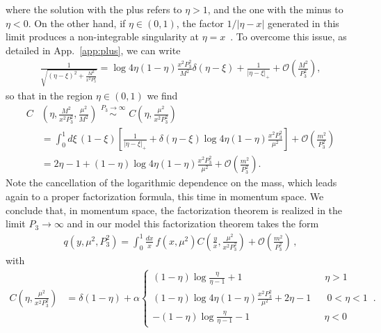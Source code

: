 where the solution with the plus refers to $\eta>1$, and the one with the minus
to $\eta<0$. On the other hand, if $\eta \in \left(0,1\right)$, the factor
$1/|\eta-x|$ generated in this limit produces a non-integrable singularity at
$\eta = x$~\cite{Radyushkin:2017lvu}. To overcome this issue, as detailed in App.~\ref{app:plus}, we can
write
\begin{align}
	\label{eq::limit} 
	\frac{1}{\sqrt{\left(\eta-\xi\right)^2 + \frac{M^2}{x^2 P_3^2}}} 
	= \log 4\eta\left(1-\eta\right) \frac{x^2P_3^2}{M^2}
	\delta\left(\eta-\xi\right) + \frac{1}{|\eta-\xi|_+} + \mathcal{O}\left(\frac{M^2}{P_3^2}\right),
\end{align}
so that in the region $\eta \in \left(0,1\right)$  we find
\begin{align}
	C&\left(\eta,\frac{M^2}{x^2 P_3^2}, \frac{\mu^2}{M^2}\right) 
	 \,\,
	\stackrel{P_3\rightarrow \infty}{\sim}\,\, C\left(\eta,\frac{\mu^2}{x^2 P_3^2}\right) \nonumber\\
	&=\int_0^1 d\xi\, \left(1-\xi\right) 
	\left[\frac{1}{|\eta-\xi|_+} + \delta\left(\eta-\xi\right)
	\log 4\eta\left(1-\eta\right)
	\frac{x^2P_3^2}{\mu^2} \right]  + \mathcal{O}\left(\frac{m^2}{P_3^2}\right) \nonumber \\
	&=2\eta -1 + \left(1-\eta\right)
	\log 4\eta\left(1-\eta\right) \frac{x^2P_3^2}{\mu^2} + \mathcal{O}\left(\frac{m^2}{P_3^2}\right). 
\end{align}
Note the cancellation of the logarithmic dependence on the mass, which leads
again to a proper factorization formula, this time in momentum space. We
conclude that, in momentum space, the factorization theorem is realized in the
limit $P_3\rightarrow \infty$ and in our model this factorization theorem takes
the form
\begin{align}
	\label{eq::factmomentum}
	q\left(y, \mu^2, P_3^2\right) = 
	\int_{0}^{1} \frac{dx}{x}\, 
	f\left(x,\mu^2\right) 
	C\left(\frac{y}{x},\frac{\mu^2}{x^2 P_3^2}\right) + \mathcal{O}\left(\frac{m^2}{P_3^2}\right)\, ,
\end{align}
with
\begin{equation}
	\label{eq::matching}
	\begin{split}
	C\left(\eta,\frac{\mu^2}{x^2 P_3^2} \right)&= \delta\left(1-\eta\right) + \alpha 
	\begin{cases} 
	\left(1-\eta\right)\log\frac{\eta}{\eta-1} + 1 
	\,\,\,\,\,\,\,\,\,\,\,\,\,\,\,\,\,\,\,\,\,\,\,\,\,\,\,\,\,\,\,\,\,\,\,\,\,\,\,\,\,\,\,\,\,\,\,\,\,\,\, \eta > 1\\ 
	\left(1-\eta\right)\log 4\eta\left(1-\eta\right)\frac{x^2P_3^2}{\mu^2} + 2\eta -1 \,\,\,\,\,\,\,\,\,\, 0<\eta < 1 \\ 
	-\left(1-\eta\right)\log\frac{\eta}{\eta-1} - 1 \,\,\,\,\,\,\,\,\,\,\,\,\,\,\,\,\,\,\,\,\,\,\,\,\,\,\,\,\,\,\,\,\,\,\,\,\,\,\,\,\,\,\,\,\,\, \eta<0
	\end{cases}
	\,.
	\end{split}
\end{equation}

